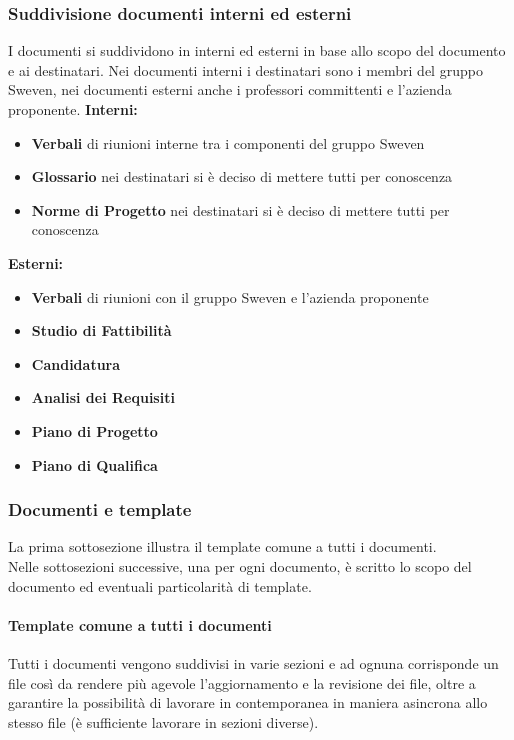 \subsubsection{Suddivisione documenti interni ed esterni}
I documenti si suddividono in interni ed esterni in base allo scopo del documento e ai destinatari.
Nei documenti interni i destinatari sono i membri del gruppo Sweven, nei documenti esterni anche i 
professori committenti e l'azienda proponente. \newline
\textbf{Interni:}
\begin{itemize}
    \item \textbf{Verbali} di riunioni interne tra i componenti del gruppo Sweven
    \item \textbf{Glossario} nei destinatari si è deciso di mettere tutti per conoscenza
    \item \textbf{Norme di Progetto} nei destinatari si è deciso di mettere tutti per conoscenza
\end{itemize}

\textbf{Esterni:}
\begin{itemize}
    \item \textbf{Verbali} di riunioni con il gruppo Sweven e l'azienda proponente
    \item \textbf{Studio di Fattibilità}
    \item \textbf{Candidatura}
    \item \textbf{Analisi dei Requisiti}
    \item \textbf{Piano di Progetto}
    \item \textbf{Piano di Qualifica}
\end{itemize}

\subsubsection{Documenti e template}
La prima sottosezione illustra il template comune a tutti i documenti.\\
Nelle sottosezioni successive, una per ogni documento, è scritto lo scopo 
del documento ed eventuali particolarità di template.
\paragraph{Template comune a tutti i documenti}
Tutti i documenti vengono suddivisi in varie sezioni e ad ognuna corrisponde 
un file così da rendere più agevole l'aggiornamento e la revisione dei file, 
oltre a garantire la possibilità di lavorare in contemporanea in maniera 
asincrona allo stesso file (è sufficiente lavorare in sezioni diverse).

